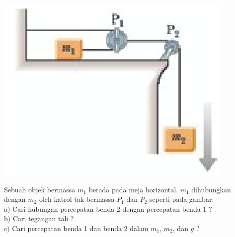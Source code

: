 \begin{center}
\includegraphics [width=\columnwidth]{latex/eps/1_5_1_image_1.eps}
\end{center}
Sebuah objek bermassa $m_{1}$ berada pada meja horizontal. $m_{1}$ dihubungkan dengan $m_{2}$ oleh katrol tak bermassa $P_{1}$ dan $P_{2}$ seperti pada gambar.\\
a$)$ Cari hubungan percepatan benda 2 dengan percepatan benda 1 ? \\
b$)$ Cari tegangan tali ?\\
c$)$ Cari percepatan benda 1 dan benda 2 dalam $m_{1}$, $m_{2}$, dan $g$ ?

